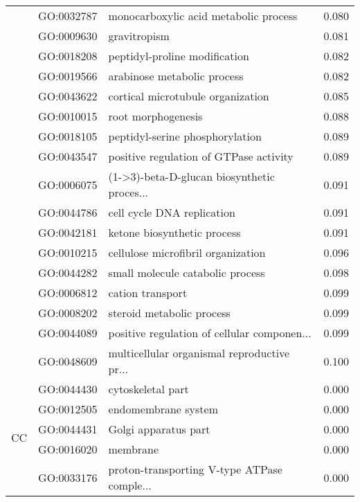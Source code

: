 \begin{longtable}{lllr}
   & GO:0032787 &        monocarboxylic acid metabolic process &         0.080 \\
   & GO:0009630 &                                 gravitropism &         0.081 \\
   & GO:0018208 &                peptidyl-proline modification &         0.082 \\
   & GO:0019566 &                  arabinose metabolic process &         0.082 \\
   & GO:0043622 &            cortical microtubule organization &         0.085 \\
   & GO:0010015 &                           root morphogenesis &         0.088 \\
   & GO:0018105 &              peptidyl-serine phosphorylation &         0.089 \\
   & GO:0043547 &       positive regulation of GTPase activity &         0.089 \\
   & GO:0006075 &  (1->3)-beta-D-glucan biosynthetic proces... &         0.091 \\
   & GO:0044786 &                   cell cycle DNA replication &         0.091 \\
   & GO:0042181 &                  ketone biosynthetic process &         0.091 \\
   & GO:0010215 &           cellulose microfibril organization &         0.096 \\
   & GO:0044282 &             small molecule catabolic process &         0.098 \\
   & GO:0006812 &                             cation transport &         0.099 \\
   & GO:0008202 &                    steroid metabolic process &         0.099 \\
   & GO:0044089 &  positive regulation of cellular componen... &         0.099 \\
   & GO:0048609 &  multicellular organismal reproductive pr... &         0.100 \\
\cline{1-4}
\multirow{43}{*}{CC} & GO:0044430 &                            cytoskeletal part &         0.000 \\
   & GO:0012505 &                          endomembrane system &         0.000 \\
   & GO:0044431 &                         Golgi apparatus part &         0.000 \\
   & GO:0016020 &                                     membrane &         0.000 \\
   & GO:0033176 &  proton-transporting V-type ATPase comple... &         0.000 \\

\end{longtable}
